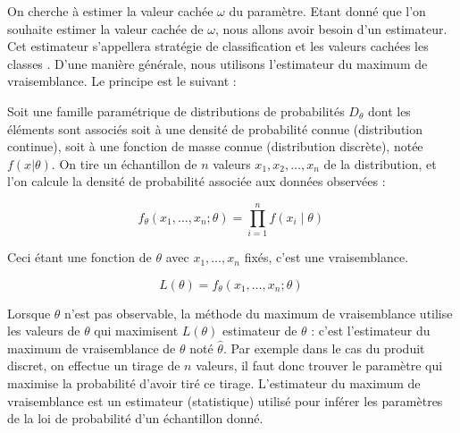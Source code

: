 On cherche à estimer la valeur cachée $\omega$ du paramètre. Etant donné que l'on souhaite estimer la valeur cachée de $\omega$, nous allons avoir besoin d'un estimateur.
Cet estimateur s'appellera \og stratégie de classification \fg{} et les valeurs cachées les \og classes \fg{}. D'une manière générale, nous utilisons l'estimateur du maximum de vraisemblance. Le principe est le suivant :

Soit une famille paramétrique de distributions de probabilités $D_\theta$ dont les éléments sont associés soit à une densité de probabilité connue (distribution continue), soit à une fonction de masse connue (distribution discrète), notée $f(x \vert \theta)$. 
On tire un échantillon de $n$ valeurs $x_1, x_2, \ldots, x_n$ de la distribution, et l'on calcule la densité de probabilité associée aux données observées :

\[ {\displaystyle f_{\theta }(x_{1},\dots ,x_{n};\theta )=\prod _{i=1}^{n}f(x_{i}\mid \theta )\,} \]

Ceci étant une fonction de $\theta$ avec $x_1, \ldots, x_n$  fixés, c'est une vraisemblance.

\[  {\displaystyle L(\theta )=f_{\theta }(x_{1},\dots ,x_{n};\theta )\,} \]

Lorsque $\theta$ n'est pas observable, la méthode du maximum de vraisemblance utilise les valeurs de $\theta$ qui maximisent $L(\theta)$ estimateur de $\theta$ : c'est l'estimateur du maximum de vraisemblance de $\theta$ noté ${\displaystyle {\widehat {\theta }}}$. Par exemple dans le cas du produit discret, on effectue un tirage de $n$ valeurs, il faut donc trouver le paramètre qui maximise la probabilité d'avoir tiré ce tirage.
L'estimateur du maximum de vraisemblance est un estimateur (statistique) utilisé pour inférer les paramètres de la loi de probabilité d'un échantillon donné.

